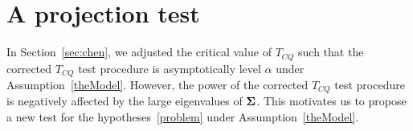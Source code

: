 \documentclass[review]{elsarticle}
\theoremstyle{plain}
\theoremstyle{definition}
\theoremstyle{remark}
\begin{document}




\section{A projection test}\label{methodology}


In Section~\ref{sec:chen}, we adjusted the critical value of $T_{CQ}$ such that the corrected $T_{CQ}$ test procedure is asymptotically level $\alpha$ under Assumption~\ref{theModel}.
However, %
the power of the corrected $T_{CQ}$ test procedure is negatively affected by the large eigenvalues of $\boldsymbol{\Sigma}$.
This motivates us to propose a new test for the hypotheses~\eqref{problem} under Assumption~\ref{theModel}.

\end{document}
